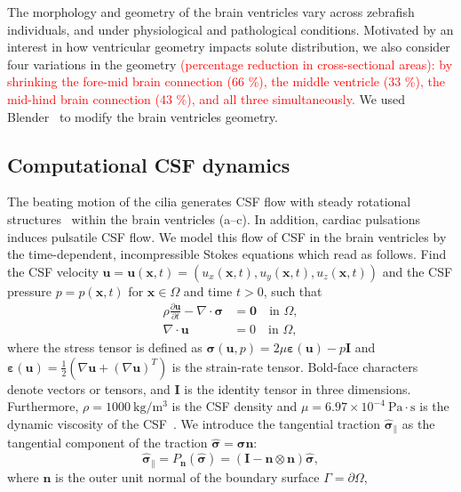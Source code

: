 \documentclass[fleqn]{wlscirep}
\newcommand{\pdifft}[1]{\frac{\partial  #1}{\partial t}}
\newcommand{\nn}{\mathbf{n}}
\newcommand{\uu}{\mathbf{u}}
\newcommand{\xx}{\bm{x}}
\newcommand{\bsig}{\bm{\sigma}}
\newcommand{\bsigpar}{\hat{\bsig}_{\parallel}}
\newcommand{\beps}{\bm{\varepsilon}}
\newcommand{\fixme}[1]{\textcolor{red}{#1}}
\begin{document}
The morphology and geometry of the brain ventricles vary across zebrafish
individuals, and under physiological and pathological conditions. 
Motivated by an interest in how ventricular geometry impacts solute distribution,
we also consider four variations in the geometry \fixme{(percentage reduction in cross-sectional areas):
by shrinking the fore-mid brain connection (66 \%), 
the middle ventricle (33 \%), the mid-hind brain connection (43 \%), and all three simultaneously.} 
We used Blender~\cite{Community2018BlenderPackage} to modify the brain ventricles geometry.

\subsection*{Computational CSF dynamics}
The beating motion of the cilia generates CSF flow with steady rotational
structures~\cite{Olstad2019CiliaryDevelopment}
within the brain ventricles (a--c).
In addition, cardiac pulsations induces pulsatile CSF flow.
We model this flow of CSF in the brain ventricles by the time-dependent,
incompressible Stokes equations which read as follows.
Find the CSF velocity $\uu = \uu(\xx, t) = (u_x(\xx, t), u_y(\xx, t), u_z(\xx, t))$
and the CSF pressure $p = p(\xx, t)$ for $\xx \in \Omega$ and time $t>0$, such that
\begin{subequations}
    \begin{align}
      \rho \pdifft{\uu} - \nabla \cdot \bsig &= \mathbf{0}
      \quad \text{in } \Omega,\\
      \nabla \cdot \uu &= 0
      \quad  \text{in } \Omega,
  \end{align}
  \label{eq:stokes_eqs}%
\end{subequations}%
where the stress tensor is defined as $\bsig(\uu, p) = 2\mu\beps(\uu) - p\mathbf{I}$
and $\beps(\uu) = \frac{1}{2}\left(\nabla \uu + (\nabla\uu)^T\right)$ is the strain-rate tensor. 
Bold-face characters denote vectors or tensors, and $\mathbf{I}$ is the identity tensor in three dimensions.
Furthermore, $\rho=1000 \ \mathrm{kg/m^3}$ is the CSF density
and $\mu=6.97\times 10^{-4} \ \mathrm{Pa\cdot s}$ is the dynamic viscosity
of the CSF~\cite{Bloomfield1998EffectsFluid}.
We introduce the tangential traction $\bsigpar$ as the
tangential component of the traction $\hat{\bsig}=\bsig\nn$:
\begin{equation*}
    \bsigpar = P_{\nn}(\hat{\bsig}) = (\mathbf{I} - \nn\otimes\nn)\hat{\bsig},
\end{equation*}
where $\nn$ is the outer unit normal of the boundary surface $\Gamma = \partial\Omega$,
\end{document}
